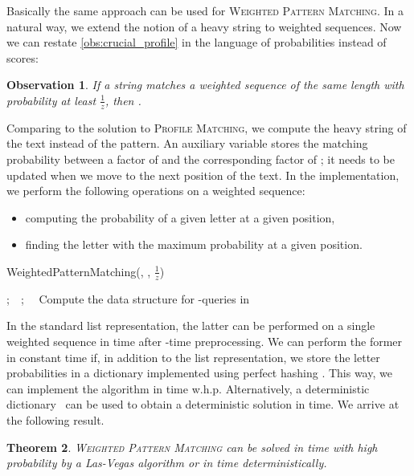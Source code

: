 \documentclass{article}
\theoremstyle{plain}
\newtheorem{theorem}{Theorem}[section]
\newtheorem{observation}[theorem]{Observation}
\theoremstyle{definition}
\newcommand{\PM}{\textsc{Profile Matching}\xspace}
\newcommand{\WPM}{\textsc{Weighted Pattern Matching}\xspace}
\newcommand{\fr}{\ensuremath{\frac1z}}
\begin{document}
    Basically the same approach can be used for \WPM.
    In a natural way, we extend the notion of a heavy string to weighted sequences.
    Now we can restate \cref{obs:crucial_profile} in the language of probabilities instead of scores:
    \begin{observation}\label{obs:crucial}
      If a string  matches a weighted sequence  of the same length with probability at least \fr,
      then .
    \end{observation}

    Comparing to the solution to \PM, we compute the heavy string of the text instead
    of the pattern.
    An auxiliary variable  stores the matching probability between a factor
    of  and the corresponding factor of ; it needs to be updated when we move to the next position
    of the text.
    In the implementation, we perform the following operations on a weighted sequence:
    \begin{itemize}
      \item computing the probability of a given letter at a given position,
      \item finding the letter with the maximum probability at a given position.
    \end{itemize}

      \begin{procedure}[h]
      \caption{WeightedPatternMatching(, , \fr)}
      ;\ \ ;\ \ \;
      \;
      Compute the data structure for -queries in \;
      \;
      \Return{}\;
    \end{procedure}

    In the standard list representation, the latter can be performed on a single weighted sequence
    in  time after -time preprocessing.
    We can perform the former in constant time if, in addition to the list representation,
    we store the letter probabilities in a dictionary implemented using perfect hashing \cite{DBLP:journals/jacm/FredmanKS84}.
    This way, we can implement the algorithm in  time w.h.p.
    Alternatively, a deterministic dictionary~\cite{DBLP:conf/icalp/Ruzic08} can be used to obtain a deterministic solution in  time.
    We arrive at the following result.

    \begin{theorem}\label{thm:wpm}
      \WPM can be solved in  time with high probability by a Las-Vegas algorithm
      or in  time deterministically.
    \end{theorem}
\end{document}

